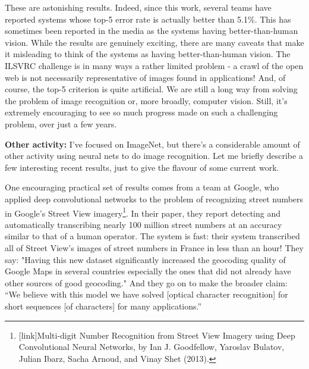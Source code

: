 \documentclass[a4paper,twoside,10pt]{book}
\begin{document}
These are astonishing results. Indeed, since this work, several teams have reported systems whose top-5 error rate is actually better than 5.1\%. This has sometimes been reported in the media as the systems having better-than-human vision. While the results are genuinely exciting, there are many caveats that make it misleading to think of the systems as having better-than-human vision. The ILSVRC challenge is in many ways a rather limited problem - a crawl of the open web is not necessarily representative of images found in applications! And, of course, the top-5 criterion is quite artificial. We are still a long way from solving the problem of image recognition or, more broadly, computer vision. Still, it's extremely encouraging to see so much progress made on such a challenging problem, over just a few years.

\textbf{Other activity:} I've focused on ImageNet, but there's a considerable amount of other activity using neural nets to do image recognition. Let me briefly describe a few interesting recent results, just to give the flavour of some current work.

One encouraging practical set of results comes from a team at Google, who applied deep convolutional networks to the problem of recognizing street numbers in Google's Street View imagery\footnote{[link]Multi-digit Number Recognition from Street View Imagery using Deep Convolutional Neural Networks, by Ian J. Goodfellow, Yaroslav Bulatov, Julian Ibarz, Sacha Arnoud, and Vinay Shet (2013).}. In their paper, they report detecting and automatically transcribing nearly 100 million street numbers at an accuracy similar to that of a human operator. The system is fast: their system transcribed all of Street View's images of street numbers in France in less than an hour! They say: "Having this new dataset significantly increased the geocoding quality of Google Maps in several countries especially the ones that did not already have other sources of good geocoding." And they go on to make the broader claim: ``We believe with this model we have solved [optical character recognition] for short sequences [of characters] for many applications.''
\end{document}
